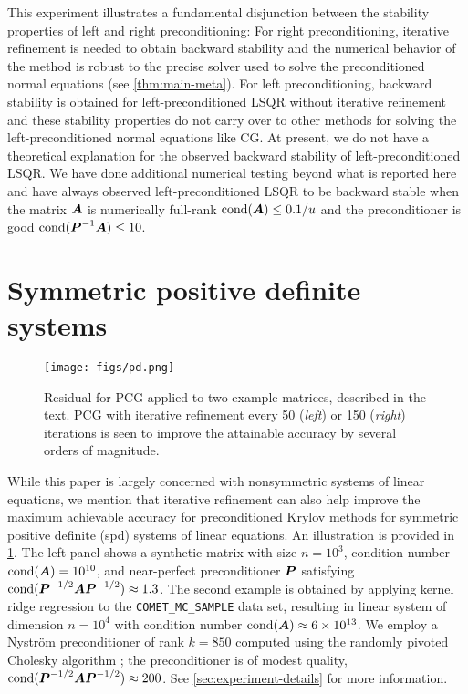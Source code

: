 \documentclass[onefignum,onetabnum,pagebackref,dvipsnames]{siamart220329}
\begin{document}
This experiment illustrates a fundamental disjunction between the stability properties of left and right preconditioning:
For right preconditioning, iterative refinement is needed to obtain backward stability and the numerical behavior of the method is robust to the precise solver used to solve the preconditioned normal equations (see \cref{thm:main-meta}).
For left preconditioning, backward stability is obtained for left-preconditioned LSQR without iterative refinement and these stability properties do not carry over to other methods for solving the left-preconditioned normal equations like CG.
At present, we do not have a theoretical explanation for the observed backward stability of left-preconditioned LSQR.
We have done additional numerical testing beyond what is reported here and have always observed left-preconditioned LSQR to be backward stable when the matrix $\boldsymbol{A}$ is numerically full-rank $\operatorname{cond}(\boldsymbol{A})\le 0.1/u$ and the preconditioner is good $\operatorname{cond}(\boldsymbol{P}^{-1}\boldsymbol{A}) \le 10$.

\section{Symmetric positive definite systems} \label{sec:pd}

\begin{figure}
    \centering
    \texttt{[image: figs/pd.png]}
    \caption{Residual for PCG applied to two example matrices, described in the text.
    PCG with iterative refinement every 50 (\emph{left}) or 150 (\emph{right}) iterations is seen to improve the attainable accuracy by several orders of magnitude.}
    \label{fig:pd}
\end{figure}

While this paper is largely concerned with nonsymmetric systems of linear equations, we mention that iterative refinement can also help improve the maximum achievable accuracy for preconditioned Krylov methods for symmetric positive definite (spd) systems of linear equations.
An illustration is provided in \cref{fig:pd}.
The left panel shows a synthetic matrix with 
size $n=10^3$, condition number $\operatorname{cond}(\boldsymbol{A}) = 10^{10}$, and near-perfect preconditioner $\boldsymbol{P}$ satisfying $\operatorname{cond}(\boldsymbol{P}^{-1/2}\boldsymbol{A}\boldsymbol{P}^{-1/2}) \approx 1.3$.
The second example is obtained by applying kernel ridge regression to the \texttt{COMET\_MC\_SAMPLE} data set, resulting in linear system of dimension $n = 10^4$ with condition number $\operatorname{cond}(\boldsymbol{A})\approx 6\times 10^{13}$.
We employ a Nystr\"om preconditioner of rank $k = 850$ computed using the randomly pivoted Cholesky algorithm \cite{CETW25,DEF+23}; the preconditioner is of modest quality, $\operatorname{cond}(\boldsymbol{P}^{-1/2}\boldsymbol{A}\boldsymbol{P}^{-1/2}) \approx 200$.
See \cref{sec:experiment-details} for more information.
\end{document}
